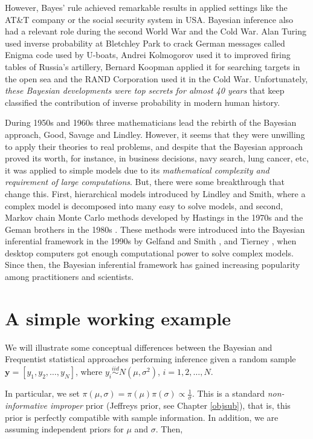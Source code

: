 However, Bayes' rule achieved remarkable results in applied settings like the AT\&T company or the social security system in USA. Bayesian inference also had a relevant role during the second World War and the Cold War. Alan Turing used inverse probability at Bletchley Park to crack German messages called Enigma code used by U-boats, Andrei Kolmogorov used it to improved firing tables of Russia's artillery, Bernard Koopman applied it for searching targets in the open sea and the RAND Corporation used it in the Cold War. Unfortunately, \textit{these Bayesian developments were top secrets for almost 40 years} that keep classified the contribution of inverse probability in modern human history.

During 1950s and 1960s three mathematicians lead the rebirth of the Bayesian approach, Good, Savage and Lindley. However, it seems that they were unwilling to apply their theories to real problems, and despite that the Bayesian approach proved its worth, for instance, in business decisions, navy search, lung cancer, etc, it was applied to simple models due to its \textit{mathematical complexity and requirement of large computations}. But, there were some breakthrough that change this. First, hierarchical models introduced by Lindley and Smith, where a complex model is decomposed into many easy to solve models, and second, Markov chain Monte Carlo methods developed by Hastings in the 1970s \cite{hastings70} and the Geman brothers in the 1980s \cite{Geman1984}. These methods were introduced into the Bayesian inferential framework in the 1990s by Gelfand and Smith \cite{Gelfand1990}, and Tierney \cite{tierney1994markov}, when desktop computers got enough computational power to solve complex models. Since then, the Bayesian inferential framework has gained increasing popularity among practitioners and scientists.

\section{A simple working example}\label{sec26}

We will illustrate some conceptual differences between the Bayesian and Frequentist statistical approaches performing inference given a random sample $\mathbf{y}=[y_1,y_2,\dots,y_N]$, where $y_i\stackrel{iid}{\sim} N(\mu, \sigma^2)$, $i=1,2,\dots,N$.

In particular, we set $\pi(\mu,\sigma)=\pi(\mu)\pi(\sigma)\propto \frac{1}{\sigma}$. This is a standard \textit{non-informative improper} prior (Jeffreys prior, see Chapter \ref{objsub}), that is, this prior is perfectly compatible with sample information. In addition, we are assuming independent priors for $\mu$ and $\sigma$. Then,

